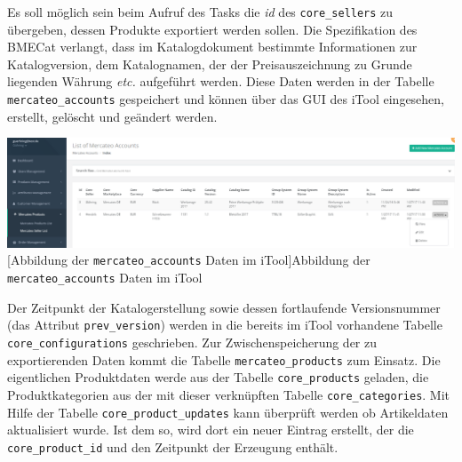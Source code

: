 	Es soll möglich sein beim Aufruf des Tasks die \textit{id} des \texttt{core\_sellers} zu übergeben, dessen Produkte exportiert werden sollen. Die Spezifikation des BMECat verlangt, dass im Katalogdokument bestimmte Informationen zur Katalogversion, dem Katalognamen, der der Preisauszeichnung zu Grunde liegenden Währung \textit{etc.} aufgeführt werden. Diese Daten werden in der Tabelle \texttt{mercateo\_accounts} gespeichert und können über das GUI des iTool eingesehen, erstellt, gelöscht und geändert werden.\\
	
	\begin{minipage}{\linewidth}
		\vspace{1em}
		\centering
		\includegraphics[width=1 \linewidth]{img/iToolSeller}
		[Abbildung der \texttt{mercateo\_accounts} Daten im iTool]{Abbildung der \texttt{mercateo\_accounts} Daten im iTool}
		\vspace{1em}
	\end{minipage}
	
	 Der Zeitpunkt der Katalogerstellung sowie dessen fortlaufende Versionsnummer (das Attribut \texttt{prev\_version}) werden in die bereits im iTool vorhandene Tabelle \texttt{core\_configurations} geschrieben. Zur Zwischenspeicherung der zu exportierenden Daten kommt die Tabelle \texttt{mercateo\_products} zum Einsatz. Die eigentlichen Produktdaten werde aus der Tabelle \texttt{core\_products} geladen, die Produktkategorien aus der mit dieser verknüpften Tabelle \texttt{core\_categories}. Mit Hilfe der Tabelle \texttt{core\_product\_updates} kann überprüft werden ob Artikeldaten aktualisiert wurde. Ist dem so, wird dort ein neuer Eintrag erstellt, der die \texttt{core\_product\_id} und den Zeitpunkt der Erzeugung enthält.
	

	
	
